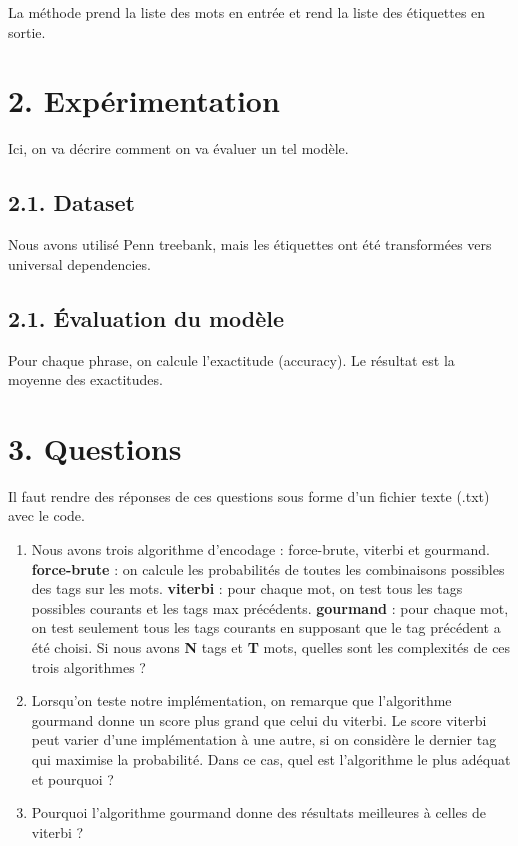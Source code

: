 \documentclass[11pt, a4paper]{article}
\begin{document}
La méthode prend la liste des mots en entrée et rend la liste des étiquettes en sortie.

\section*{2. Expérimentation}

Ici, on va décrire comment on va évaluer un tel modèle.

\subsection*{2.1. Dataset}

Nous avons utilisé Penn treebank, mais les étiquettes ont été transformées vers universal dependencies. 

\subsection*{2.1. Évaluation du modèle}

Pour chaque phrase, on calcule l'exactitude (accuracy).
Le résultat est la moyenne des exactitudes.

\section*{3. Questions}

Il faut rendre des réponses de ces questions sous forme d'un fichier texte (.txt) avec le code.

\begin{enumerate}
	\item Nous avons trois algorithme d'encodage : force-brute, viterbi et gourmand. 
	\textbf{force-brute} : on calcule les probabilités de toutes les combinaisons possibles des tags sur les mots.
	\textbf{viterbi} : pour chaque mot, on test tous les tags possibles courants et les tags max précédents.
	\textbf{gourmand} : pour chaque mot, on test seulement tous les tags courants en supposant que le tag précédent a été choisi.
	Si nous avons \textbf{N} tags et \textbf{T} mots, quelles sont les complexités de ces trois algorithmes ?
	\item Lorsqu'on teste notre implémentation, on remarque que l'algorithme gourmand donne un score plus grand que celui du viterbi. Le score viterbi peut varier d'une implémentation à une autre, si on considère le dernier tag qui maximise la probabilité. Dans ce cas, quel est l'algorithme le plus adéquat et pourquoi ?
	\item Pourquoi l'algorithme gourmand donne des résultats meilleures à celles de viterbi ?
\end{enumerate}
\end{document}
